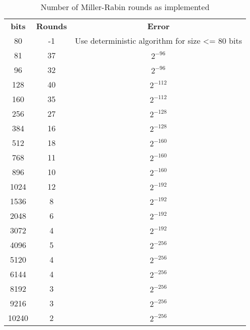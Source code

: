\documentclass[synpaper]{book}
\begin{document}
\begin{table}[h]
  \begin{center}
    \begin{tabular}{c c c}
      \textbf{bits} & \textbf{Rounds} & \textbf{Error}                                  \\
      80            & -1              & Use deterministic algorithm for size <= 80 bits \\
      81            & 37              & $2^{-96}$                                       \\
      96            & 32              & $2^{-96}$                                       \\
      128           & 40              & $2^{-112}$                                      \\
      160           & 35              & $2^{-112}$                                      \\
      256           & 27              & $2^{-128}$                                      \\
      384           & 16              & $2^{-128}$                                      \\
      512           & 18              & $2^{-160}$                                      \\
      768           & 11              & $2^{-160}$                                      \\
      896           & 10              & $2^{-160}$                                      \\
      1024          & 12              & $2^{-192}$                                      \\
      1536          & 8               & $2^{-192}$                                      \\
      2048          & 6               & $2^{-192}$                                      \\
      3072          & 4               & $2^{-192}$                                      \\
      4096          & 5               & $2^{-256}$                                      \\
      5120          & 4               & $2^{-256}$                                      \\
      6144          & 4               & $2^{-256}$                                      \\
      8192          & 3               & $2^{-256}$                                      \\
      9216          & 3               & $2^{-256}$                                      \\
      10240         & 2               & $2^{-256}$
    \end{tabular}
    \caption{ Number of Miller-Rabin rounds as implemented } \label{table:millerrabinrunsimpl}
  \end{center}
\end{table}
\end{document}

